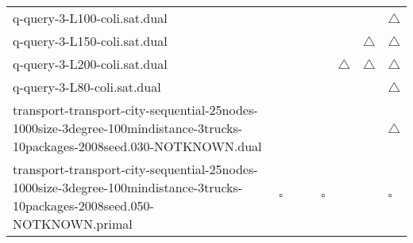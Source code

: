 {\begin{longtable}{p{7cm}lllllll}
  q-query-3-L100-coli.sat.dual                                                                                                &             &                                           &                                           &                                           &                                           &                                                    & $\triangle$                                        \\
  q-query-3-L150-coli.sat.dual                                                                                                &             &                                           &                                           &                                           &                                           & $\triangle$                                        & $\triangle$                                        \\
  q-query-3-L200-coli.sat.dual                                                                                                &             &                                           &                                           &                                           & $\triangle$                               & $\triangle$                                        & $\triangle$                                        \\
  q-query-3-L80-coli.sat.dual                                                                                                 &             &                                           &                                           &                                           &                                           &                                                    & $\triangle$                                        \\
  transport-transport-city-sequential-25nodes-1000size-3degree-100mindistance-3trucks-10packages-2008seed.030-NOTKNOWN.dual   &             &                                           &                                           &                                           &                                           &                                                    & $\triangle$                                        \\
  transport-transport-city-sequential-25nodes-1000size-3degree-100mindistance-3trucks-10packages-2008seed.050-NOTKNOWN.primal & $\square$   &                                           &                                           & $\square$                                 &                                           &                                                    & $\square$                                          \\

\end{longtable}}
